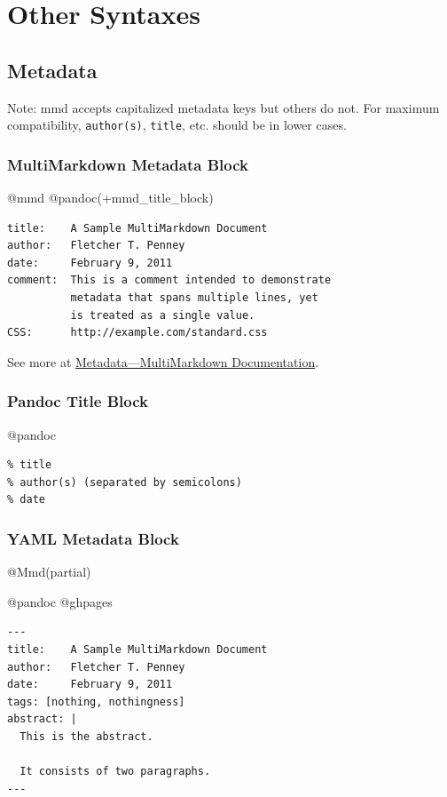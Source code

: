 \documentclass[]{article}
\begin{document}
\hypertarget{other-syntaxes}{\section{Other
Syntaxes}\label{other-syntaxes}}

\subsection{Metadata}\label{metadata}

Note: mmd accepts capitalized metadata keys but others do not. For
maximum compatibility, \texttt{author(s)}, \texttt{title}, etc. should
be in lower cases.

\subsubsection{MultiMarkdown Metadata
Block}\label{multimarkdown-metadata-block}

@mmd @pandoc(+mmd\_title\_block)

\begin{verbatim}
title:    A Sample MultiMarkdown Document  
author:   Fletcher T. Penney  
date:     February 9, 2011  
comment:  This is a comment intended to demonstrate  
          metadata that spans multiple lines, yet  
          is treated as a single value.  
CSS:      http://example.com/standard.css
\end{verbatim}

See more at
\href{http://fletcher.github.io/MultiMarkdown-5/metadata.html}{Metadata---MultiMarkdown
Documentation}.

\subsubsection{Pandoc Title Block}\label{pandoc-title-block}

@pandoc

\begin{verbatim}
% title
% author(s) (separated by semicolons)
% date
\end{verbatim}

\subsubsection{YAML Metadata Block}\label{yaml-metadata-block}

@Mmd(partial)

@pandoc @ghpages

\begin{verbatim}
---
title:    A Sample MultiMarkdown Document  
author:   Fletcher T. Penney  
date:     February 9, 2011  
tags: [nothing, nothingness]
abstract: |
  This is the abstract.

  It consists of two paragraphs.
---
\end{verbatim}
\end{document}
